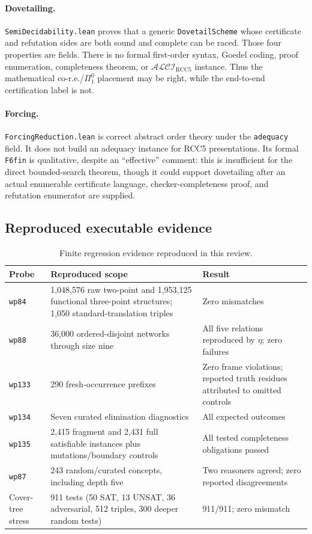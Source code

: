\documentclass[11pt]{article}
\newcommand{\Logic}{\ensuremath{\mathcal{ALCI}_{\mathrm{RCC5}}}}
\newcommand{\code}[1]{\texttt{#1}}
\begin{document}
\paragraph{Dovetailing.}
\code{SemiDecidability.lean} proves that a generic \code{DovetailScheme} whose
certificate and refutation sides are both sound and complete can be raced.
Those four properties are fields.  There is no formal first-order syntax,
Goedel coding, proof enumeration, completeness theorem, or \Logic{} instance.
Thus the mathematical co-r.e./\(\Pi^0_1\) placement may be right, while the
end-to-end certification label is not.

\paragraph{Forcing.}
\code{ForcingReduction.lean} is correct abstract order theory under the
\code{adequacy} field.  It does not build an adequacy instance for RCC5
presentations.  Its formal \code{F6fin} is qualitative, despite an
``effective'' comment: this is insufficient for the direct bounded-search
theorem, though it could support dovetailing after an actual enumerable
certificate language, checker-completeness proof, and refutation enumerator are
supplied.

\subsection{Reproduced executable evidence}

\begin{table}[ht]
\centering\small
\begin{tabularx}{\textwidth}{L{0.18\textwidth}Y L{0.20\textwidth}}
\toprule
Probe & Reproduced scope & Result \\
\midrule
\code{wp84} & 1,048,576 raw two-point and 1,953,125 functional three-point
structures; 1,050 standard-translation triples & Zero mismatches \\
\code{wp88} & 36,000 ordered-disjoint networks through size nine & All five
relations reproduced by \(\eta\); zero failures \\
\code{wp133} & 290 fresh-occurrence prefixes & Zero frame violations; reported
truth residues attributed to omitted controls \\
\code{wp134} & Seven curated elimination diagnostics & All expected outcomes \\
\code{wp135} & 2,415 fragment and 2,431 full satisfiable instances plus
mutations/boundary controls & All tested completeness obligations passed \\
\code{wp87} & 243 random/curated concepts, including depth five & Two reasoners
agreed; zero reported disagreements \\
Cover-tree stress & 911 tests (50 SAT, 13 UNSAT, 36 adversarial, 512 triples,
300 deeper random tests) & 911/911; zero mismatch \\
\bottomrule
\end{tabularx}
\caption{Finite regression evidence reproduced in this review.}
\end{table}
\end{document}

